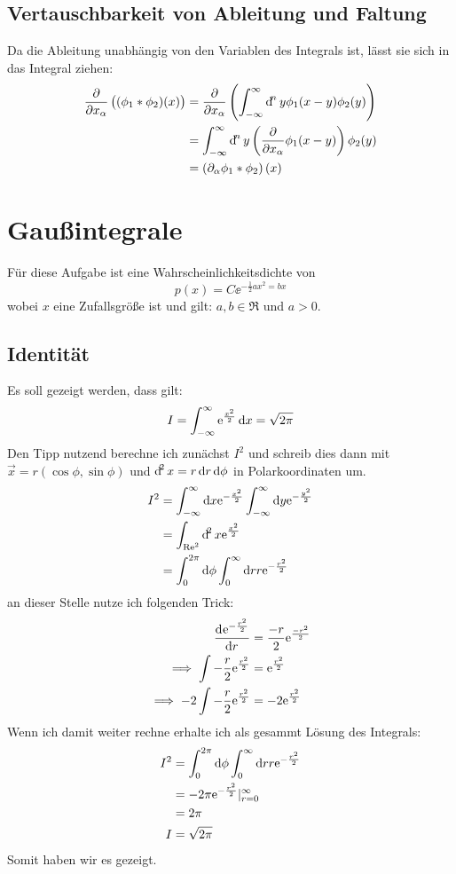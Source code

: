 \subsection{Vertauschbarkeit von Ableitung und Faltung}
Da die Ableitung unabhängig von den Variablen des Integrals ist, lässt sie sich in das Integral ziehen:
\begin{align}
  \frac{\partial}{\partial x_\alpha} \left((\phi_1 * \phi_2)(x)\right) &= \frac{\partial}{\partial x_\alpha} \left(\int^\infty_{-\infty}\dif^n y \phi_1(x-y)\phi_2(y)\right)	\\
  &= \int^\infty_{-\infty}\dif^n y \left(\frac{\partial}{\partial x_\alpha} \phi_1(x-y)\right)\phi_2(y)	\\
  &= \left(\partial_\alpha \phi_1 * \phi_2\right)(x)
\end{align}


\section{Gaußintegrale}
Für diese Aufgabe ist eine Wahrscheinlichkeitsdichte von 
\[
    p(x) = C\ee^{-\frac 12ax^2=bx} 
\]
wobei $x$ eine Zufallsgröße ist und gilt: $a,b\in\Re$ und $a>0$.

\subsection{Identität}
Es soll gezeigt werden, dass gilt:
\[
    I = \int^\infty_{-\infty}\ee^{\frac{x^2}{2}}\dif x = \sqrt{2\pi}
\]
Den Tipp nutzend berechne ich zunächst $I^2$ und schreib dies dann mit $\vec x = r(\cos\phi,\sin\phi)$ und $\dif^2x = r\dif r\dif\phi$  in Polarkoordinaten um.
\begin{align*}
    I^2 &= \int^\infty_{-\infty}\dif x\ee^{-\frac{x^2}{2}}\int^\infty_{-\infty}\dif y\ee^{-\frac{y^2}{2}} \\
        &= \int_{\Re^2}\dif^2x\ee^{\frac{x^2}{2}} \\
        &= \int^{2\pi}_0\dif\phi\int^\infty_0\dif rr\ee^{-\frac{r^2}{2}} \\
\end{align*}
an dieser Stelle nutze ich folgenden Trick:
\begin{align*}
    \dod {\ee^{-\frac{r^2}{2}}}{r} &= \frac{-r}{2}\ee^{\frac{-r^2}{2}} \\
    \implies \int -\frac r2 \ee^{\frac{r^2}2} &= \ee^{\frac{r^2}2} \\
    \implies -2\int -\frac r2 \ee^{\frac{r^2}2} &= -2\ee^{\frac{r^2}2} \\
\end{align*}
Wenn ich damit weiter rechne erhalte ich als gesammt Lösung des Integrals:
\begin{align*}
    I^2 &= \int^{2\pi}_0\dif\phi\int^\infty_0\dif rr\ee^{-\frac{r^2}{2}} \\
        &=-2\pi\ee^{-\frac{r^2}2}|^\infty_{r=0} \\
        &= 2\pi \\
    I &= \sqrt{2\pi}
\end{align*}
Somit haben wir es gezeigt.


